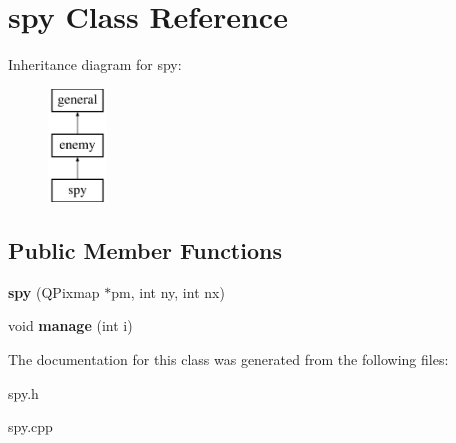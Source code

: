 \hypertarget{classspy}{\section{spy \-Class \-Reference}
\label{classspy}
}
\-Inheritance diagram for spy\-:\begin{figure}[H]
\begin{center}
\leavevmode
\includegraphics[height=3.000000cm]{classspy}
\end{center}
\end{figure}
\subsection*{\-Public \-Member \-Functions}
\begin{DoxyCompactItemize}
\item 
\hypertarget{classspy_a5ba34a2ac51a94cbcbe02cd7137d9a4d}{{\bfseries spy} (\-Q\-Pixmap $\ast$pm, int ny, int nx)}\label{classspy_a5ba34a2ac51a94cbcbe02cd7137d9a4d}

\item 
\hypertarget{classspy_a62d51f0a8565603b7fbc454afd57baee}{void {\bfseries manage} (int i)}\label{classspy_a62d51f0a8565603b7fbc454afd57baee}

\end{DoxyCompactItemize}


\-The documentation for this class was generated from the following files\-:\begin{DoxyCompactItemize}
\item 
spy.\-h\item 
spy.\-cpp\end{DoxyCompactItemize}
